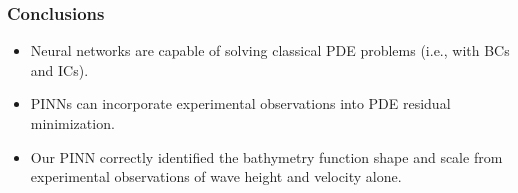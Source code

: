 \begin{frame}
    \frametitle{Conclusions}

    \begin{itemize}[<+->]
        \setlength\itemsep{2em}
        \item Neural networks are capable of solving classical PDE problems (i.e., with BCs and ICs).
        \item PINNs can incorporate experimental observations into PDE residual minimization.
        \item Our PINN correctly identified the bathymetry function shape and scale from experimental observations of 
              wave height and velocity alone.
    \end{itemize}
\end{frame}